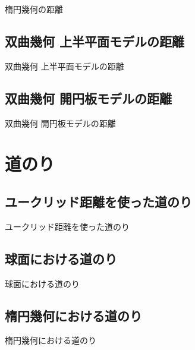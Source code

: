 楕円幾何の距離

\newpage


\subsection{双曲幾何 上半平面モデルの距離}

双曲幾何 上半平面モデルの距離

\newpage


\subsection{双曲幾何 開円板モデルの距離}

双曲幾何 開円板モデルの距離

\newpage


\section{道のり}

\newpage

\subsection{ユークリッド距離を使った道のり}

ユークリッド距離を使った道のり

\newpage


\subsection{球面における道のり}

球面における道のり

\newpage


\subsection{楕円幾何における道のり}

楕円幾何における道のり

\newpage

